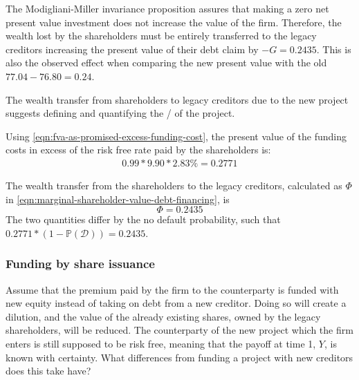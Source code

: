 \documentclass[../main.tex]{subfiles}
\begin{document}
        The Modigliani-Miller invariance proposition assures that making a zero net present value investment 
        does not increase the value of the firm.
        Therefore, the wealth lost by the shareholders must be entirely transferred to the legacy creditors 
        increasing the present value of their debt claim by $-G = 0.2435$. 
        This is also the observed effect when comparing the new present value with the old 
        $77.04 - 76.80 = 0.24$.

        The wealth transfer from shareholders to legacy creditors due to the new project 
        suggests defining and quantifying the \FVA/ of the project. 
        
        Using \cref{eqn:fva-as-promised-excess-funding-cost}, the present value of the funding costs 
        in excess of the risk free rate paid by the shareholders is: 
        \begin{align}
            0.99 * 9.90 * 2.83\% = 0.2771
        \end{align}

        The wealth transfer from the shareholders to the legacy creditors, 
        calculated as $\Phi$ in \cref{eqn:marginal-shareholder-value-debt-financing}, is
        \begin{equation}
            \Phi = 0.2435
        \end{equation}
        The two quantities differ by the no default probability, such that 
        $0.2771 * (1-\mathbb{P}\left(\mathcal{D}\right)) = 0.2435$.

    \subsubsection{Funding by share issuance}
        Assume that the premium paid by the firm to the counterparty is funded with new equity instead of taking on debt from a new creditor. 
        Doing so will create a dilution, and the value of the already existing shares, owned by the legacy shareholders, will be reduced. 
        The counterparty of the new project which the firm enters is still supposed to be risk free, meaning that the payoff at time 1, $Y$, is known with certainty. 
        What differences from funding a project with new creditors does this take have?
\end{document}
